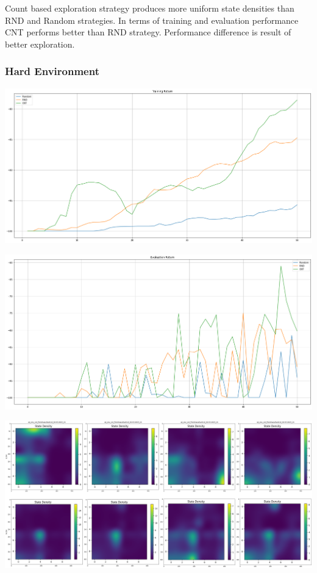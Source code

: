 \documentclass[11pt]{article}
\begin{document}
    Count based exploration strategy produces more uniform state densities than RND and Random strategies.
    In terms of training and evaluation performance CNT performs better than RND strategy.
    Performance difference is result of better exploration.

    \subsubsection{Hard Environment}

    \hspace*{-0.3in}
    \includegraphics[scale=0.30]{p1/q1-p2-cnt-hard-train}

    \hspace*{-0.6in}
    \includegraphics[scale=0.30]{p1/q1-p2-cnt-hard-eval}

    \hspace*{-0.6in}
    \includegraphics[scale=0.2]{p1/q1-p2-cnt-hard-state-density}
\end{document}
